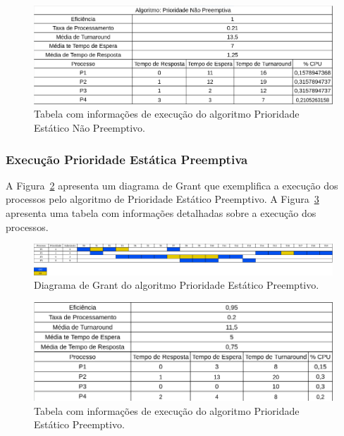 \documentclass[
	12pt,				%
	oneside,   	        %
	a4paper,			%
	english,			%
	french,				%
	spanish,			%
	brazil,				%
	]{pacotes/abntex2}
\begin{document}
\begin{figure}[H]
  \centering
  \includegraphics[scale=0.5]{figuras/ex3/tabela/prio_sem_preemp.png}
  \caption{Tabela com informações de execução do algoritmo Prioridade Estático Não Preemptivo.}
  \label{fig:ex3/tabela/prio_sem_preemp}
\end{figure}

\subsubsection{Execução Prioridade Estática Preemptiva}
\label{subsubsec:prio_preemp}

A Figura~\ref{fig:ex3/diagrama/prio_preemp} apresenta um diagrama de Grant que exemplifica a execução dos processos pelo algoritmo de Prioridade Estático Preemptivo. A Figura~\ref{fig:ex3/tabela/prio_preemp} apresenta uma tabela com informações detalhadas sobre a execução dos processos.

\begin{figure}[H]
  \centering
  \includegraphics[scale=0.20]{figuras/ex3/diagrama/prio_preemp.png}
  \caption{Diagrama de Grant do algoritmo Prioridade Estático Preemptivo.}
  \label{fig:ex3/diagrama/prio_preemp}
\end{figure}

\begin{figure}[H]
  \centering
  \includegraphics[scale=0.5]{figuras/ex3/tabela/prio_preemp.png}
  \caption{Tabela com informações de execução do algoritmo Prioridade Estático Preemptivo.}
  \label{fig:ex3/tabela/prio_preemp}
\end{figure}
\end{document}
